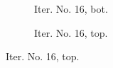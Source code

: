 \documentclass[a4paper,12pt]{amsart}
\numberwithin{equation}{section}
\begin{document}
\begin{figure}[h!]
\begin{subfigure}[t]{0.49\textwidth}
    \caption{Iter. No. 16, bot.}
\end{subfigure}
	\hfill
\begin{subfigure}[t]{0.49\textwidth}
    \caption{Iter. No. 16, top.}
\end{subfigure}


\end{figure}
\end{document}
